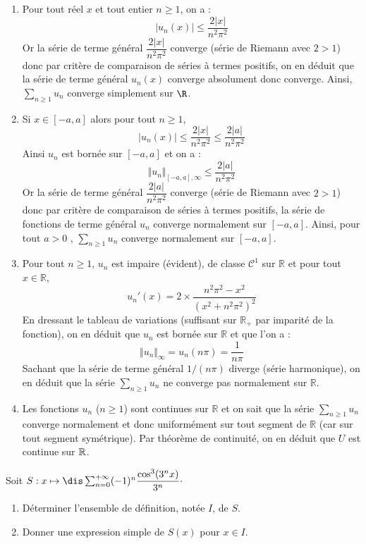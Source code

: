 \documentclass[a4paper,10pt]{report}
\newcommand{\Sum}[2]{\ensuremath{\textstyle{\sum\limits_{#1}^{#2}}}}
\begin{document}
\corr \begin{enumerate}
\item Pour tout réel $x$ et tout entier $n \geq 1$, on a :
$$\left| u_{n}\left( x\right) \right| \leq 
\frac{2\left| x\right| }{n^{2}\pi ^{2}}$$
Or la s\'{e}rie de terme g\'{e}n\'{e}ral $\dfrac{2\left| x\right| }{n^{2}\pi ^{2}}$ converge (série de Riemann avec $2>1$) donc par critère de comparaison de séries à termes positifs, on en déduit que la série de terme général $u_{n}\left( x\right) $ converge absolument donc converge. Ainsi, $\Sum{n \geq 1}{} u_n$ converge simplement sur $\R$.
\item Si $x\in \left[ -a,a\right] $ alors pour tout $n \geq 1$, 
$$\left| u_{n}\left( x\right) \right| \leq \frac{2\left| x\right| }{n^{2}\pi ^{2}}\leq \frac{2\left|
a\right| }{n^{2}\pi ^{2}}$$
Ainsi $u_n$ est bornée sur $[-a,a]$ et on a :
$$ \Vert u_n \Vert_{[-a,a], \infty} \leq  \frac{2\left|a\right| }{n^{2}\pi ^{2}}$$
Or la s\'{e}rie de terme g\'{e}n\'{e}ral $\dfrac{2\left| a\right| }{n^{2}\pi ^{2}}$ converge (série de Riemann avec $2>1$) donc par critère de comparaison de séries à termes positifs, la série de fonctions de terme général $u_n$ converge normalement sur $[-a,a]$. Ainsi, pour tout $a > 0$ , $\Sum{n \geq 1}{} u_n$ converge normalement sur $[-a,a]$.
\item Pour tout $n \geq 1$, $u_n$ est impaire (évident), de classe $\mathcal{C}^1$ sur $\mathbb{R}$ et pour tout $x \in \mathbb{R}$,
$$u_n'(x) = 2 \times \frac{n^2\pi^2-x^2}{(x^2+n^2 \pi^2)^2}$$
En dressant le tableau de variations (suffisant sur $\mathbb{R}_+$ par imparité de la fonction), on en déduit que $u_n$ est bornée sur $\mathbb{R}$ et que l'on a :
$$ \Vert u_n \Vert_{\infty} = u_n( n \pi) = \frac{1}{n \pi}$$
Sachant que la série de terme général $1/(n\pi)$ diverge (série harmonique), on en déduit que la s\'{e}rie $\Sum{n \geq 1}{} u_{n}$ ne converge pas normalement sur $\mathbb{R}$.
\item Les fonctions $u_{n}$ ($n \geq 1$) sont continues sur $\mathbb{R}$ et on sait que la s\'{e}rie $\Sum{n \geq 1}{} u_{n}$ converge normalement et donc uniformément sur tout segment de $\mathbb{R}$ (car sur tout segment symétrique). Par théorème de continuité, on en déduit que $U$ est continue sur $\Bbb{R}$.
\end{enumerate}

\medskip

\begin{Exercice}{} Soit $S : x \mapsto \dis \sum_{n=0}^{+ \infty}  (-1)^n \dfrac{\cos^3(3^nx)}{3^n} \cdot$

\begin{enumerate}
\item Déterminer l'ensemble de définition, notée $I$, de $S$.
\item Donner une expression simple de $S(x)$ pour $x \in I$.
\end{enumerate}
\end{Exercice}
\end{document}
